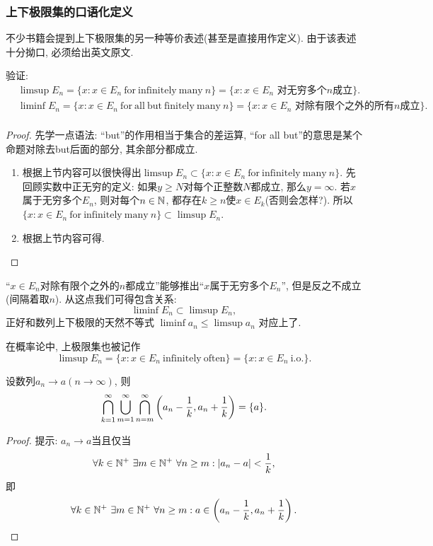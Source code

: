 \subsubsection*{上下极限集的口语化定义}
不少书籍会提到上下极限集的另一种等价表述(甚至是直接用作定义). 由于该表述十分拗口, 必须给出英文原文.
\begin{example}
    验证:
    \begin{align*}
    &\limsup E_n = \{x: x\in E_n \mathrm{~for~infinitely~many~}n\}
    = \{x: x \in E_n \text{ 对无穷多个}n\text{成立} \}. \\
    &\liminf E_n = \{x: x\in E_n \mathrm{~for~all~but~finitely~many~}n\}
    = \{x: x \in E_n \text{ 对除有限个之外的所有}n\text{成立} \}. \\
    \end{align*}
\end{example}
\begin{proof}
    先学一点语法: “but”的作用相当于集合的差运算, “for all but”的意思是某个命题对除去but后面的部分, 其余部分都成立. 
    \begin{enumerate}
    \item 根据上节内容可以很快得出$\limsup E_n \subset \{x: x\in E_n \mathrm{~for~infinitely~many~}n\}$. 先回顾实数中正无穷的定义: 如果$y\geq N$对每个正整数$N$都成立, 那么$y=\infty$. 若$x$属于无穷多个$E_n$, 则对每个$n \in \mathbb{N}$, 都存在$k \geq n$使$x \in E_k$(否则会怎样?). 所以$\{x: x\in E_n \mathrm{~for~infinitely~many~}n\} \subset \limsup E_n$. 
    \item 根据上节内容可得.
    \end{enumerate}
\end{proof}
\begin{remark}
    “$x \in E_n$对除有限个之外的$n$都成立”能够推出“$x$属于无穷多个$E_n$”, 但是反之不成立(间隔着取$n$). 从这点我们可得包含关系:
    $$ \liminf E_n \subset \limsup E_n, $$
    正好和数列上下极限的天然不等式
    $\liminf a_n \leq \limsup a_n$ 对应上了. 
    
    在概率论中, 上极限集也被记作
    $$\limsup E_n = \{x: x\in E_n \mathrm{~infinitely~often}\}=\{x: x\in E_n \mathrm{~i.o.}\}.$$
\end{remark}
\begin{exercise}
    设数列$a_n \to a (n \to \infty)$, 则
    $$\bigcap_{k=1}^{\infty}\bigcup_{m=1}^{\infty}\bigcap_{n=m}^{\infty}
    \left(a_n - \frac{1}{k}, a_n + \frac{1}{k}\right) = \{a\}. $$
\end{exercise}
\begin{proof}
    提示: $a_n \to a$当且仅当
    $$\forall k \in \mathbb{N}^+ ~\exists m \in \mathbb{N}^+ ~\forall n \geq m: 
    |a_n - a| < \frac{1}{k}, $$
    即
    $$\forall k \in \mathbb{N}^+ ~\exists m \in \mathbb{N}^+ ~\forall n \geq m: 
    a \in \left(a_n - \frac{1}{k}, a_n + \frac{1}{k}\right).$$
\end{proof}
